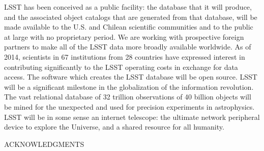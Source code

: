 \documentclass{emulateapj}
\begin{document}


LSST has been conceived as a public facility: the database that it will
produce, and the associated object catalogs that are generated from that
database, will be made available to the U.S. and Chilean
scientific communities and to the public at large with no proprietary period. 
We are working with prospective foreign partners to make all of the LSST data more broadly 
available worldwide.  As of 2014, scientists in 67 institutions from
28 countries have expressed interest in contributing significantly to
the LSST operating costs in exchange for data access.  The software
which creates the LSST database will be open source.  
LSST will  be a significant milestone in the globalization of the information revolution.
The vast relational database of 32 trillion observations of 40 billion objects
will be mined for the unexpected and used for precision experiments in astrophysics.
LSST will be in some sense an internet telescope:
the ultimate network peripheral device to explore the Universe, and
a shared resource for all humanity. 

\vskip 0.15in
\centerline{ACKNOWLEDGMENTS}
\end{document}
